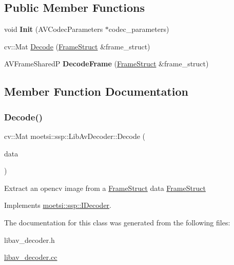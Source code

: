 \subsection*{Public Member Functions}
\begin{DoxyCompactItemize}
\item 
\mbox{\label{classmoetsi_1_1ssp_1_1LibAvDecoder_a631ce4158ab4f456a26951674f96a803}} 
void {\bfseries Init} (A\+V\+Codec\+Parameters $\ast$codec\+\_\+parameters)
\item 
cv\+::\+Mat \hyperlink{classmoetsi_1_1ssp_1_1LibAvDecoder_a4206a4581de1b93d6c6a0835e8cf4ac8}{Decode} (\hyperlink{structmoetsi_1_1ssp_1_1FrameStruct}{Frame\+Struct} \&frame\+\_\+struct)
\item 
\mbox{\label{classmoetsi_1_1ssp_1_1LibAvDecoder_a41c94bd7fa9576902ea0a6e95e59d93e}} 
A\+V\+Frame\+SharedP {\bfseries Decode\+Frame} (\hyperlink{structmoetsi_1_1ssp_1_1FrameStruct}{Frame\+Struct} \&frame\+\_\+struct)
\end{DoxyCompactItemize}


\subsection{Member Function Documentation}
\mbox{\label{classmoetsi_1_1ssp_1_1LibAvDecoder_a4206a4581de1b93d6c6a0835e8cf4ac8}} 
\subsubsection{\texorpdfstring{Decode()}{Decode()}}
{\footnotesize\ttfamily cv\+::\+Mat moetsi\+::ssp\+::\+Lib\+Av\+Decoder\+::\+Decode (\begin{DoxyParamCaption}\item[{\hyperlink{structmoetsi_1_1ssp_1_1FrameStruct}{Frame\+Struct} \&}]{data }\end{DoxyParamCaption})\hspace{0.3cm}{\ttfamily [virtual]}}

Extract an opencv image from a \hyperlink{structmoetsi_1_1ssp_1_1FrameStruct}{Frame\+Struct}  data \hyperlink{structmoetsi_1_1ssp_1_1FrameStruct}{Frame\+Struct} 

Implements \hyperlink{classmoetsi_1_1ssp_1_1IDecoder_a1c06604dc4107d3668a4e791c13cc063}{moetsi\+::ssp\+::\+I\+Decoder}.



The documentation for this class was generated from the following files\+:\begin{DoxyCompactItemize}
\item 
libav\+\_\+decoder.\+h\item 
\hyperlink{libav__decoder_8cc}{libav\+\_\+decoder.\+cc}\end{DoxyCompactItemize}
